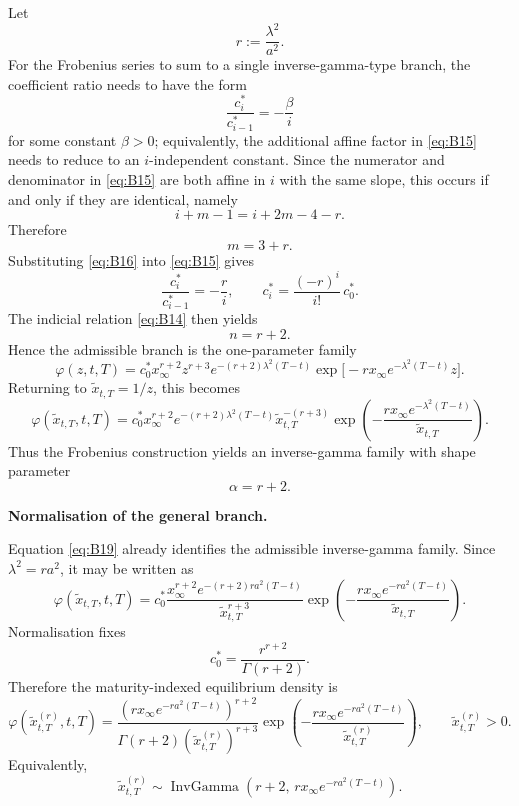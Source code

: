 \documentclass[12pt]{article}
\theoremstyle{statementstyle}
\begin{document}
\begin{appendices}
Let
\[
r:=\frac{\lambda^{2}}{a^{2}}.
\]
For the Frobenius series to sum to a single inverse-gamma-type branch,
the coefficient ratio needs to have the form
\[
\frac{c_i^{*}}{c_{i-1}^{*}}=-\frac{\beta}{i}
\]
for some constant \(\beta>0\); equivalently, the additional affine factor
in \eqref{eq:B15} needs to reduce to an \(i\)-independent constant. Since the
numerator and denominator in \eqref{eq:B15} are both affine in \(i\) with
the same slope, this occurs if and only if they are identical, namely
\[
i+m-1=i+2m-4-r.
\]
Therefore
\begin{equation}
m=3+r.
\tag{B.1.6}\label{eq:B16}
\end{equation}
Substituting \eqref{eq:B16} into \eqref{eq:B15} gives
\begin{equation}
\frac{c_i^{*}}{c_{i-1}^{*}}=-\frac{r}{i},
\qquad
c_i^{*}=\frac{(-r)^i}{i!}\,c_0^{*}.
\tag{B.1.7}\label{eq:B17}
\end{equation}
The indicial relation \eqref{eq:B14} then yields
\begin{equation}
n=r+2.
\tag{B.1.8}\label{eq:B18}
\end{equation}
Hence the admissible branch is the one-parameter family
\[
\varphi(z,t,T)
=
c_0^{*}x_{\infty}^{r+2}z^{r+3}e^{-(r+2)\lambda^{2}(T-t)}
\exp\!\bigl[-r x_{\infty}e^{-\lambda^{2}(T-t)}z\bigr].
\]
Returning to \(\widetilde{x}_{t,T}=1/z\), this becomes
\begin{equation}
\varphi(\widetilde{x}_{t,T},t,T)
=
c_0^{*}x_{\infty}^{r+2}e^{-(r+2)\lambda^{2}(T-t)}
\widetilde{x}_{t,T}^{-(r+3)}
\exp\!\left(-\frac{r x_{\infty}e^{-\lambda^{2}(T-t)}}{\widetilde{x}_{t,T}}\right).
\tag{B.1.9}\label{eq:B19}
\end{equation}
Thus the Frobenius construction yields an inverse-gamma family with shape
parameter
\[
\alpha=r+2.
\]


\medskip
\noindent\textbf{Normalisation of the general branch.}

Equation \eqref{eq:B19} already identifies the admissible inverse-gamma family. Since
\(\lambda^{2}=ra^{2}\), it may be written as
\[
\varphi(\widetilde{x}_{t,T},t,T)
=
c_0^{*}
\frac{x_{\infty}^{r+2}e^{-(r+2)ra^{2}(T-t)}}{\widetilde{x}_{t,T}^{r+3}}
\exp\!\left(-\frac{r x_{\infty}e^{-ra^{2}(T-t)}}{\widetilde{x}_{t,T}}\right).
\]
Normalisation fixes
\[
c_0^{*}=\frac{r^{r+2}}{\Gamma(r+2)}.
\]
Therefore the maturity-indexed equilibrium density is
\begin{equation}
\boxed{
\varphi(\widetilde{x}^{(r)}_{t,T},t,T)
=
\frac{\left(r x_{\infty}e^{-ra^{2}(T-t)}\right)^{r+2}}
{\Gamma(r+2)\left(\widetilde{x}^{(r)}_{t,T}\right)^{r+3}}
\exp\!\left(
-\frac{r x_{\infty}e^{-ra^{2}(T-t)}}{\widetilde{x}^{(r)}_{t,T}}
\right),
\qquad \widetilde{x}^{(r)}_{t,T}>0.
}
\tag{B.1.10}\label{eq:B110}
\end{equation}
Equivalently,
\[
\widetilde{x}^{(r)}_{t,T}
\sim
\operatorname{InvGamma}\!\left(r+2,\,r x_{\infty}e^{-ra^{2}(T-t)}\right).
\]


\end{appendices}
\end{document}
